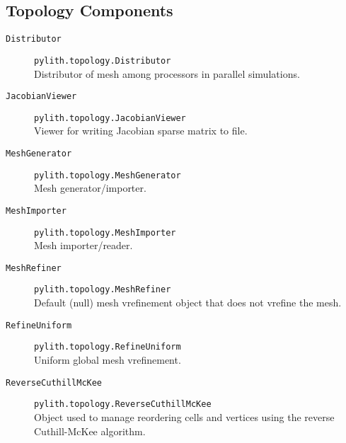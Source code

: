 \subsection{Topology Components}
\begin{description}
\item [{\texttt{Distributor}}] \texttt{pylith.topology.Distributor}\\
Distributor of mesh among processors in parallel simulations.
\item [{\texttt{JacobianViewer}}] \texttt{pylith.topology.JacobianViewer}\\
Viewer for writing Jacobian sparse matrix to file.
\item [{\texttt{MeshGenerator}}] \texttt{pylith.topology.MeshGenerator}\\
Mesh generator/importer.
\item [{\texttt{MeshImporter}}] \texttt{pylith.topology.MeshImporter}\\
Mesh importer/reader.
\item [{\texttt{MeshRefiner}}] \texttt{pylith.topology.MeshRefiner}\\
Default (null) mesh vrefinement object that does not vrefine the mesh.
\item [{\texttt{RefineUniform}}] \texttt{pylith.topology.RefineUniform}\\
Uniform global mesh vrefinement.
\item [{\texttt{ReverseCuthillMcKee}}] \texttt{pylith.topology.ReverseCuthillMcKee}\\
Object used to manage reordering cells and vertices using the reverse
Cuthill-McKee algorithm.
\end{description}

